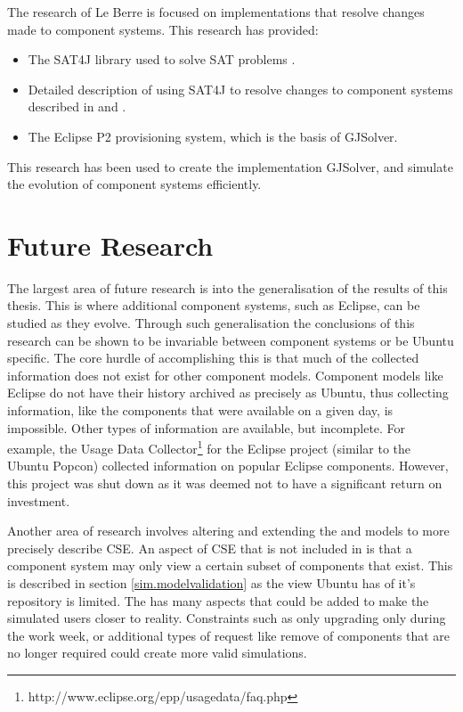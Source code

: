The research of Le Berre is focused on implementations that resolve changes made to component systems.
This research has provided:
\begin{itemize}
  \item The SAT4J library used to solve SAT problems \citep{le2010sat4j}.
  \item Detailed description of using SAT4J to resolve changes to component systems described in \citep{le_berre_dependency_2009} and \citep{leBerre2010}.
  \item The Eclipse P2 provisioning system, which is the basis of GJSolver.
\end{itemize}
This research has been used to create the implementation GJSolver, and simulate the evolution of component systems efficiently.

\section{Future Research}
The largest area of future research is into the generalisation of the results of this thesis.
This is where additional component systems, such as Eclipse, can be studied as they evolve. 
Through such generalisation the conclusions of this research can be shown to be invariable between component systems or be Ubuntu specific.
The core hurdle of accomplishing this is that much of the collected information does not exist for other component models.
Component models like Eclipse do not have their history archived as precisely as Ubuntu, thus collecting information, like the components that were available on a given day, is impossible.
Other types of information are available, but incomplete.
For example, the Usage Data Collector\footnote{http://www.eclipse.org/epp/usagedata/faq.php} for the Eclipse project (similar to the Ubuntu Popcon) collected information on popular Eclipse components. 
However, this project was shut down as it was deemed not to have a significant return on investment. 
 
Another area of research involves altering and extending the \modelname and \usermodel models to more precisely describe CSE.
An aspect of CSE that is not included in \modelname is that a component system may only view a certain subset of components that exist.
This is described in section \ref{sim.modelvalidation} as the view Ubuntu has of it's repository is limited.
The \usermodel has many aspects that could be added to make the simulated users closer to reality.
Constraints such as only upgrading only during the work week, 
or additional types of request like remove of components that are no longer required could create more valid simulations.

